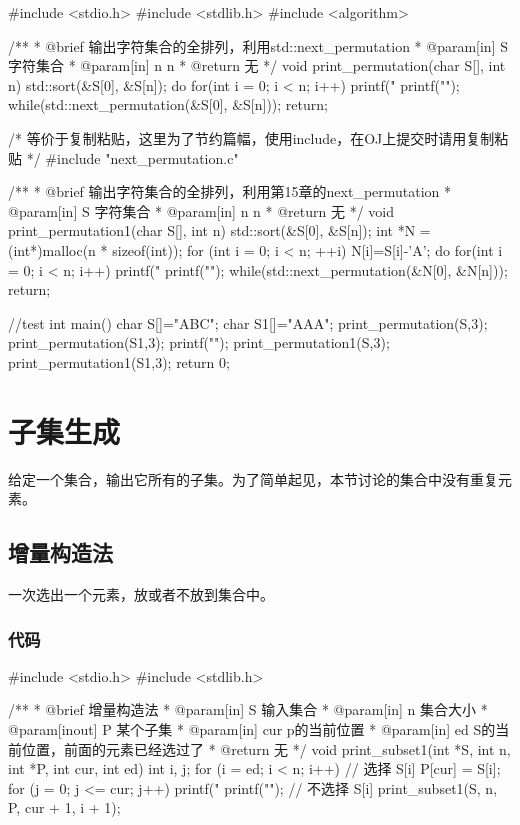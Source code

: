 \begin{Codex}[label=print_permutation_next.c]
#include <stdio.h>
#include <stdlib.h>
#include <algorithm>

/**
 * @brief 输出字符集合的全排列，利用std::next_permutation
 * @param[in] S 字符集合
 * @param[in] n n
 * @return 无
 */
void print_permutation(char S[], int n) {
    std::sort(&S[0], &S[n]);
    do {
        for(int i = 0; i < n; i++) printf("%
        printf("\n");
    }while(std::next_permutation(&S[0], &S[n]));
    return;
}

/* 等价于复制粘贴，这里为了节约篇幅，使用include，在OJ上提交时请用复制粘贴 */
#include "next_permutation.c"

/**
 * @brief 输出字符集合的全排列，利用第15章的next_permutation
 * @param[in] S 字符集合
 * @param[in] n n
 * @return 无
 */
void print_permutation1(char S[], int n) {
    std::sort(&S[0], &S[n]);
    int *N = (int*)malloc(n * sizeof(int));
    for (int i = 0; i < n; ++i) N[i]=S[i]-'A';
    do {
        for(int i = 0; i < n; i++) printf("%
        printf("\n");
    }while(std::next_permutation(&N[0], &N[n]));
    return;
}

//test
int main() {
    char S[]="ABC";
    char S1[]="AAA";
    print_permutation(S,3);
    print_permutation(S1,3);
    printf("\n\n");
    print_permutation1(S,3);
    print_permutation1(S1,3);
    return 0;
}
\end{Codex}


\section{子集生成} %
给定一个集合，输出它所有的子集。为了简单起见，本节讨论的集合中没有重复元素。


\subsection{增量构造法}
一次选出一个元素，放或者不放到集合中。

\subsubsection{代码}

\begin{Codex}[label=subset.c]
#include <stdio.h>
#include <stdlib.h>

/**
 * @brief 增量构造法
 * @param[in] S 输入集合
 * @param[in] n 集合大小
 * @param[inout] P 某个子集
 * @param[in] cur p的当前位置
 * @param[in] ed S的当前位置，前面的元素已经选过了
 * @return 无
 */
void print_subset1(int *S, int n, int *P, int cur, int ed) {
    int i, j;
    for (i = ed; i < n; i++) {
        // 选择 S[i]
        P[cur] = S[i];
        for (j = 0; j <= cur; j++) printf("%
        printf("\n");
        // 不选择 S[i]
        print_subset1(S, n, P, cur + 1, i + 1);
    }
}
\end{Codex}


